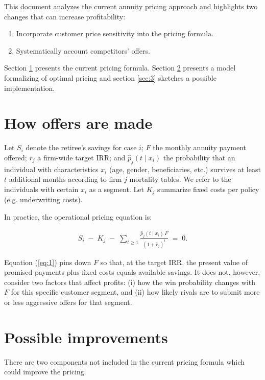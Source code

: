 \documentclass[12pt]{article}
\theoremstyle{plain}
\theoremstyle{plain}
\begin{document}
This document analyzes the current annuity pricing approach and highlights two changes that can increase profitability:

\begin{enumerate}
    \item Incorporate customer price sensitivity  into the pricing formula.
    \item Systematically account competitors' offers. 
\end{enumerate}

Section \ref{sec:1} presents the current pricing formula. Section \ref{sec:2} presents a model formalizing of optimal pricing and section \ref{sec:3} sketches a possible implementation. 


\section{How offers are made}\label{sec:1} 

Let $S_i$ denote the retiree’s savings for case $i$; $F$ the monthly annuity payment  offered; $\bar{r}_j$ a firm-wide target IRR; and $\hat{p}_j(t\mid x_i)$ the probability that an individual with characteristics $x_i$ (age, gender, beneficiaries, etc.) survives at least $t$ additional months according to firm $j$ mortality tables. We refer to the individuals with certain $x_i$ as a segment. Let $K_j$ summarize fixed costs per policy (e.g. underwriting costs). 

In practice, the operational pricing equation is:

\begin{align}\label{eq:1}
    S_i \;-\; K_j \;-\; \sum_{t\ge 1}\frac{\hat{p}_j(t\mid x_i)\,F}{(1+\bar{r}_j)^t} \;=\; 0.
\end{align}

Equation (\ref{eq:1}) pins down $F$ so that, at the target IRR, the present value of promised payments plus fixed costs equals available savings. It does not, however, consider  two factors that affect profits: (i) how the win probability changes with $F$ for this specific customer segment, and (ii) how likely rivals are to submit more or less aggressive offers for that segment. 


\section{Possible improvements}\label{sec:2} 

There are two components not included in the current pricing formula which could improve the pricing. 
\end{document}
